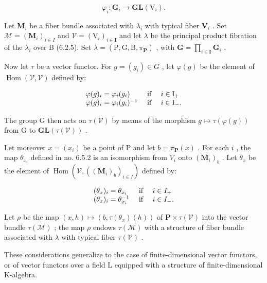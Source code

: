 \[
\varphi_{i}: \mathbf{G}_{i} \rightarrow \mathbf{GL}(\mathrm{V}_{i}).
\]

Let \(\mathbf{M}_i\) be a fiber bundle associated with \(\lambda_i\) with typical fiber \(\mathbf{V}_i\) . Set \(\mathcal{M} = (\mathbf{M}_i)_{i\in I}\) and \(\mathcal{V} = (\mathrm{V}_i)_{i\in \mathbf{I}}\) and let \(\lambda\) be the principal product fibration of the \(\lambda_{i}\) over B (6.2.5). Set \(\lambda = (\mathrm{P},\mathrm{G},\mathrm{B},\pi_{\mathbf{P}})\) , with \(\mathbf{G} = \prod_{i\in \mathbf{I}}\mathbf{G}_i\) .

Now let \(\tau\) be a vector functor. For \(g = (g_i) \in G\) , let \(\varphi(g)\) be the element of \(\operatorname{Hom}(\mathcal{V}, \mathcal{V})\) defined by:

\[
\begin{array}{l l} \varphi (g) _ {i} = \varphi_ {i} (g _ {i}) & \text { if } \quad i \in \mathrm{I} _ {+} \\ \varphi (g) _ {i} = \varphi_ {i} (g _ {i}) ^ {- 1} & \text { if } \quad i \in \mathrm{I} _ {-}. \end{array}
\]

The group G then acts on \(\tau(\mathcal{V})\) by means of the morphism \(g\mapsto\tau(\varphi(g))\) from G to \(\mathbf{GL}(\tau(\mathcal{V}))\) .

Let moreover \(x = (x_i)\) be a point of P and let \(b = \pi_{\mathbf{P}}(x)\) . For each \(i\) , the map \(\theta_{x_i}\) defined in no. 6.5.2 is an isomorphism from \(V_i\) onto \((\mathbf{M}_i)_b\) . Let \(\theta_x\) be the element of \(\operatorname{Hom}(\mathcal{V}, ((\mathbf{M}_i)_b)_{i \in I})\) defined by:

\[
\begin{array}{l l} (\theta_ {x}) _ {i} = \theta_ {x _ {i}} & \text { if } \quad i \in I _ {+} \\ (\theta_ {x}) _ {i} = \theta_ {x _ {i}} ^ {- 1} & \text { if } \quad i \in I _ {-}. \end{array}
\]

Let \(\rho\) be the map \((x, h) \mapsto (b, \tau(\theta_x)(h))\) of \(\mathbf{P} \times \tau(\mathcal{V})\) into the vector bundle \(\tau(\mathcal{M})\) ; the map \(\rho\) endows \(\tau(\mathcal{M})\) with a structure of fiber bundle associated with \(\lambda\) with typical fiber \(\tau(\mathcal{V})\) .

These considerations generalize to the case of finite-dimensional vector functors, or of vector functors over a field L equipped with a structure of finite-dimensional K-algebra.

